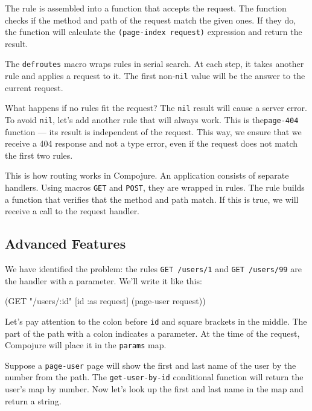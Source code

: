 
The rule is assembled into a function that accepts the request. The function checks if the method and path of the request match the given ones. If they do, the function will calculate the \verb|(page-index request)| expression and return the result.

The \verb|defroutes| macro wraps rules in serial search. At each step, it takes another rule and applies a request to it. The first non-\verb|nil| value will be the answer to the current request.

What happens if no rules fit the request? The \verb|nil| result will cause a server error. To avoid \verb|nil|, let's add another rule that will always work. This is the\verb|page-404| function — its result is independent of the request. This way, we ensure that we receive a 404 response and not a type error, even if the request does not match the first two rules.

This is how routing works in Compojure. An application consists of separate handlers. Using macros \verb|GET| and \verb|POST|, they are wrapped in rules. The rule builds a function that verifies that the method and path match. If this is true, we will receive a call to the request handler.

\subsection{Advanced Features}

We have identified the problem: the rules \verb|GET /users/1| and \verb|GET /users/99| are the handler with a parameter. We'll write it like this:



\begin{english}
\begin{clojure}
(GET "/users/:id" [id :as request] (page-user request))
\end{clojure}
\end{english}

Let's pay attention to the colon before \verb|id| and square brackets in the middle.
The part of the path with a colon indicates a parameter. At the time of the request, Compojure will place it in the \verb|params| map.

Suppose a \verb|page-user| page will show the first and last name of the user by the number from the path. The \verb|get-user-by-id| conditional function will return the user's map by number. Now let's look up the first and last name in the map and return a string.

